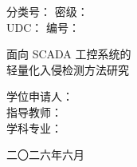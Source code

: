 \thispagestyle{empty}
\begin{center}
\vspace*{2cm}

{\fangsong{} 分类号：\underline{\hspace{2cm}}\hspace{1cm} 密级：\underline{\hspace{2cm}}}\\[0.5cm]
{\fangsong{} UDC：\underline{\hspace{2cm}}\hspace{1cm} 编号：\underline{\hspace{4cm}}}\\[4cm]

\begin{minipage}{0.9\textwidth}
\centering
{\heiti{} 面向 SCADA 工控系统的}\\[0.4cm]
{\heiti{} 轻量化入侵检测方法研究}
\end{minipage}

\vspace{3cm}

{\fangsong{} 学位申请人：\underline{\hspace{5cm}}}\\[0.6cm]
{\fangsong{} 指导教师：\underline{\hspace{5cm}}}\\[0.6cm]
{\fangsong{} 学科专业：\underline{\hspace{5cm}}}\\[0.6cm]

\vfill

{\fangsong{} 二〇二六年六月}
\end{center}

\clearpage
